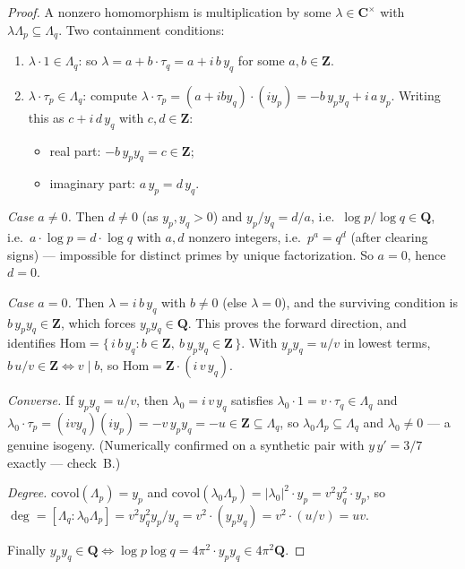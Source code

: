 \documentclass[11pt]{article}
\theoremstyle{definition}
\theoremstyle{remark}
\newcommand{\Z}{\mathbf{Z}}
\newcommand{\Q}{\mathbf{Q}}
\newcommand{\C}{\mathbf{C}}
\newcommand{\Hom}{\mathrm{Hom}}
\newcommand{\covol}{\mathrm{covol}}
\begin{document}
\begin{proof}
A nonzero homomorphism is multiplication by some $\lambda \in \C^\times$ with
$\lambda\Lambda_p \subseteq \Lambda_q$. Two containment conditions:

\begin{enumerate}
\item $\lambda\cdot 1 \in \Lambda_q$: so
$\lambda = a + b\cdot\tau_q = a + i\, b\, y_q$ for some $a, b \in \Z$.
\item $\lambda\cdot\tau_p \in \Lambda_q$: compute
$\lambda\cdot\tau_p = (a + i b y_q)\cdot(i y_p) = -b\, y_p y_q + i\, a\, y_p$.
Writing this as $c + i\, d\, y_q$ with $c, d \in \Z$:
\begin{itemize}
\item real part: $-b\, y_p y_q = c \in \Z$;
\item imaginary part: $a\, y_p = d\, y_q$.
\end{itemize}
\end{enumerate}

\emph{Case $a \neq 0$.} Then $d \neq 0$ (as $y_p, y_q > 0$) and
$y_p/y_q = d/a$, i.e.\ $\log p/\log q \in \Q$, i.e.\
$a\cdot\log p = d\cdot\log q$ with $a, d$ nonzero integers, i.e.\
$p^a = q^d$ (after clearing signs) --- impossible for distinct primes by
unique factorization. So $a = 0$, hence $d = 0$.

\emph{Case $a = 0$.} Then $\lambda = i\, b\, y_q$ with $b \neq 0$ (else
$\lambda = 0$), and the surviving condition is $b\, y_p y_q \in \Z$, which
forces $y_p y_q \in \Q$. This proves the forward direction, and identifies
$\Hom = \{\, i\, b\, y_q : b \in \Z,\ b\, y_p y_q \in \Z \,\}$. With
$y_p y_q = u/v$ in lowest terms, $b\, u/v \in \Z \iff v \mid b$, so
$\Hom = \Z\cdot(i\, v\, y_q)$.

\emph{Converse.} If $y_p y_q = u/v$, then $\lambda_0 = i\, v\, y_q$ satisfies
$\lambda_0\cdot 1 = v\cdot\tau_q \in \Lambda_q$ and
$\lambda_0\cdot\tau_p = (i v y_q)(i y_p) = -v\, y_p y_q = -u \in \Z \subseteq
\Lambda_q$, so $\lambda_0\Lambda_p \subseteq \Lambda_q$ and
$\lambda_0 \neq 0$ --- a genuine isogeny. (Numerically confirmed on a
synthetic pair with $y\, y' = 3/7$ exactly --- check~B.)

\emph{Degree.} $\covol(\Lambda_p) = y_p$ and
$\covol(\lambda_0\Lambda_p) = |\lambda_0|^2\cdot y_p = v^2 y_q^2\cdot y_p$,
so $\deg = [\Lambda_q : \lambda_0\Lambda_p] = v^2 y_q^2 y_p / y_q
= v^2\cdot(y_p y_q) = v^2\cdot(u/v) = uv$.

Finally $y_p y_q \in \Q \iff \log p \log q = 4\pi^2\cdot y_p y_q \in 4\pi^2\Q$.
\end{proof}
\end{document}
